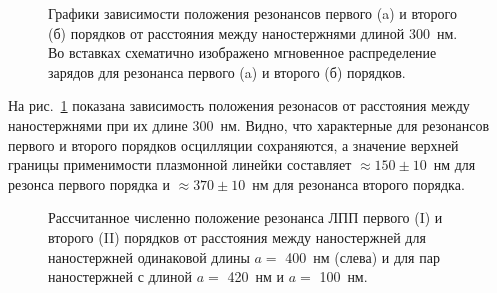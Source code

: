 \begin{figure}
\caption{Графики зависимости положения  резонансов первого (a) и второго (б) порядков от расстояния между наностержнями длиной 300~нм. Во вставках схематично изображено мгновенное распределение зарядов для резонанса первого (a) и второго (б) порядков.}
\label{img:a300PML}
\end{figure}
На рис.~\ref{img:a300PML} показана зависимость положения резонасов от расстояния между наностержнями при их длине 300~нм. Видно, что характерные для резонансов первого и второго порядков осцилляции сохраняются, а значение верхней границы применимости плазмонной линейки составляет  $ \approx 150 \pm 10 $~нм для резонса первого порядка и $ \approx 370 \pm 10 $~нм для резонанса второго порядка.
\begin{figure}
\caption{Рассчитанное численно положение резонанса ЛПП первого (I) и второго (II) порядков от расстояния между наностержней для наностержней одинаковой длины $ a = $ 400~нм (слева) и для пар наностержней с длиной $ a = $ 420~нм и $ a = $ 100~нм.}
\label{img:res_comparison}
\end{figure}

